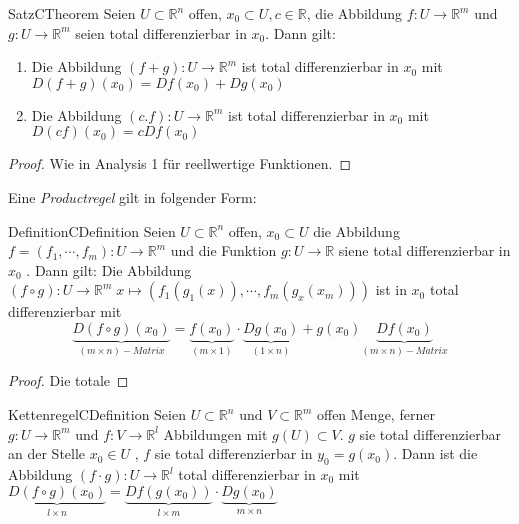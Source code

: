 	\begin{ibox}[33]{Satz}{CTheorem}
	    Seien $ U \subset \mathbb{R}^n  $ offen, $ x_0 \subset U, c \in \mathbb{R}  $, die Abbildung $ f:U \to \mathbb{R}^m $ 
		und $ g:U \to \mathbb{R}^m $ seien total differenzierbar in $ x_0 $. Dann gilt:
		\begin{enumerate}[label=\alph*)]
			\item Die Abbildung $ \left( f+g \right) : U \to \mathbb{R}^m  $ ist total differenzierbar in $ x_0 $ mit 
				$ D \left( f+g \right) (x_0) = Df\left( x_0 \right) + Dg\left( x_0 \right)  $ 
			\item Die Abbildung $ \left( c.f \right) : U \to \mathbb{R}^m $ ist total differenzierbar in $ x_0 $ mit 
				$ D\left( c f \right) (x_0) = c Df(x_0) $ 
		\end{enumerate}
	\end{ibox}
	\begin{proof}
		Wie in Analysis 1 für reellwertige Funktionen. 
	\end{proof}
Eine \textit{Productregel} gilt in folgender Form:
\begin{ibox}[34]{Definition}{CDefinition}
    Seien $ U \subset \mathbb{R}^n  $ offen, $ x_0 \subset U $ die Abbildung $ f = \left( f_1, \cdots, f_{m} \right) 
	:U \to \mathbb{R}^m$ und die Funktion $ g: U \to \mathbb{R}  $ siene total differenzierbar in $ x_0 $ . Dann gilt:
	Die Abbildung $ \left( f \circ g \right) : U \to \mathbb{R}^m \; x \mapsto \left( f_1(g_1(x)), \cdots, f_{m}(g_{x}(x_m)) \right) $ 
	ist in $ x_0 $ total differenzierbar mit
	$$
	\underbrace{ D \left( f \circ g \right) (x_0)}_{(m\times n)-Matrix} =
	\underbrace{f\left( x_0 \right)}_{(m\times 1)} \cdot \underbrace{Dg(x_0)}_{(1\times n)} +
	g(x_0)\underbrace{ Df(x_0)}_{(m\times n )- Matrix}
	$$
\end{ibox}

\begin{proof}
	Die totale  
\end{proof}

\begin{ibox}[35]{Kettenregel}{CDefinition}
    Seien $ U \subset \mathbb{R}^n \text{ und } V \subset \mathbb{R}^m  $ offen Menge, ferner $ g: U \to \mathbb{R}^m  \text{ und } 
	f:V \to \mathbb{R}^l $ Abbildungen mit $ g(U) \subset V  $. $ g $ sie total differenzierbar an der Stelle $ x_0 \in U $ 
	, $ f $ sie total differenzierbar in $ y_0 = g\left( x_0 \right)  $. Dann ist die Abbildung $ \left( f \cdot g \right) 
	:U \to \mathbb{R}^l  $ total differenzierbar in $ x_0 $ mit $ \underbrace{D \left( f \circ g \right) (x_0) }_{l\times n}= 
	\underbrace{Df(g(x_0))}_{l \times m} \cdot \underbrace{Dg(x_0)}_{m \times n}$ 
\end{ibox}

